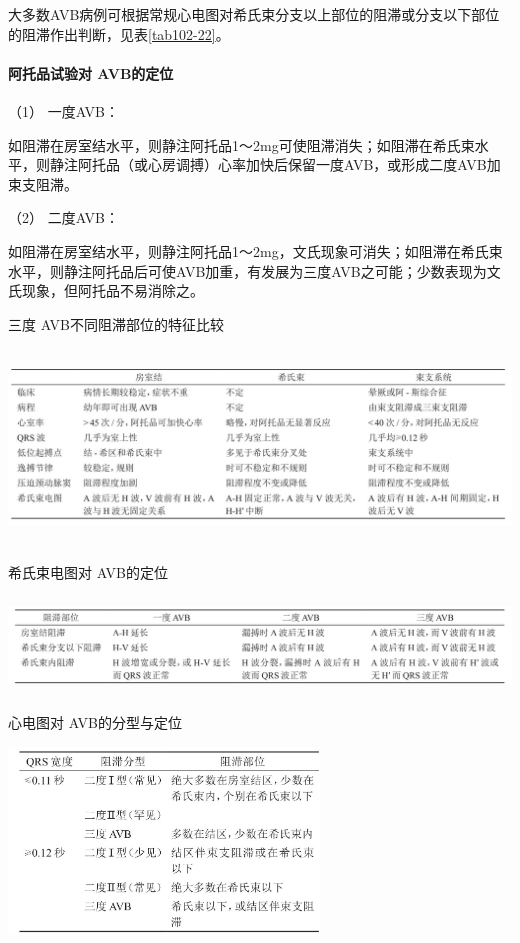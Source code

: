 大多数AVB病例可根据常规心电图对希氏束分支以上部位的阻滞或分支以下部位的阻滞作出判断，见表\ref{tab102-22}。

\paragraph{阿托品试验对 AVB的定位}

\hypertarget{text00297.htmlux5cux23CHP10-2-10-2-3-3-1}{}
（1） 一度AVB：

如阻滞在房室结水平，则静注阿托品1～2mg可使阻滞消失；如阻滞在希氏束水平，则静注阿托品（或心房调搏）心率加快后保留一度AVB，或形成二度AVB加束支阻滞。

\hypertarget{text00297.htmlux5cux23CHP10-2-10-2-3-3-2}{}
（2） 二度AVB：

如阻滞在房室结水平，则静注阿托品1～2mg，文氏现象可消失；如阻滞在希氏束水平，则静注阿托品后可使AVB加重，有发展为三度AVB之可能；少数表现为文氏现象，但阿托品不易消除之。

\begin{table}[htbp]
\centering
\caption{三度 AVB不同阻滞部位的特征比较}
\label{tab102-20}
\includegraphics[width=6.58333in,height=2.04167in]{./images/Image00461.jpg}
\end{table}

\begin{table}[htbp]
\centering
\caption{希氏束电图对 AVB的定位}
\label{tab102-21}
\includegraphics[width=6.64583in,height=1.02083in]{./images/Image00462.jpg}
\end{table}

\begin{table}[htbp]
\centering
\caption{心电图对 AVB的分型与定位}
\label{tab102-22}
\includegraphics[width=3.25in,height=1.95833in]{./images/Image00463.jpg}
\end{table}

